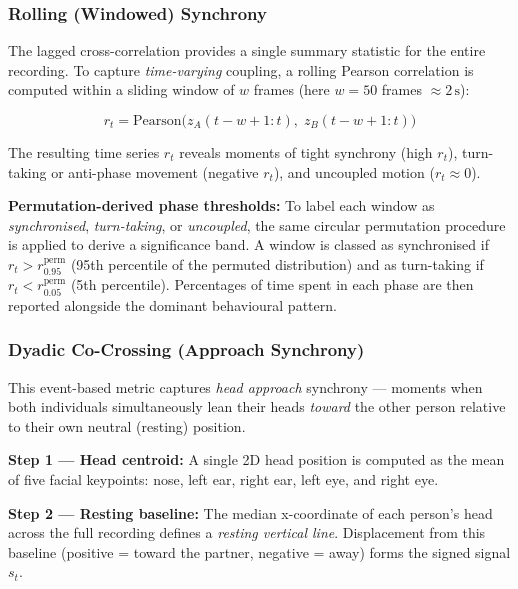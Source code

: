 \documentclass[11pt]{article}
\begin{document}
\subsubsection{Rolling (Windowed) Synchrony}
The lagged cross-correlation provides a single summary statistic for the entire recording. To capture \textit{time-varying} coupling, a rolling Pearson correlation is computed within a sliding window of $w$ frames (here $w = 50$ frames $\approx 2\,\text{s}$):

\begin{equation}
    r_t = \text{Pearson}\bigl(z_A(t-w+1:t),\; z_B(t-w+1:t)\bigr)
\end{equation}

The resulting time series $r_t$ reveals moments of tight synchrony (high $r_t$), turn-taking or anti-phase movement (negative $r_t$), and uncoupled motion ($r_t \approx 0$).

\vspace{0.5em}
\noindent\textbf{Permutation-derived phase thresholds:}
To label each window as \textit{synchronised}, \textit{turn-taking}, or \textit{uncoupled}, the same circular permutation procedure is applied to derive a significance band. A window is classed as synchronised if $r_t > r_{0.95}^{\text{perm}}$ (95th percentile of the permuted distribution) and as turn-taking if $r_t < r_{0.05}^{\text{perm}}$ (5th percentile). Percentages of time spent in each phase are then reported alongside the dominant behavioural pattern.

\subsubsection{Dyadic Co-Crossing (Approach Synchrony)}
This event-based metric captures \textit{head approach} synchrony — moments when both individuals simultaneously lean their heads \textit{toward} the other person relative to their own neutral (resting) position.

\vspace{0.5em}
\noindent\textbf{Step 1 — Head centroid:} A single 2D head position is computed as the mean of five facial keypoints: nose, left ear, right ear, left eye, and right eye.

\vspace{0.5em}
\noindent\textbf{Step 2 — Resting baseline:} The median x-coordinate of each person's head across the full recording defines a \textit{resting vertical line}. Displacement from this baseline (positive = toward the partner, negative = away) forms the signed signal $s_t$.
\end{document}

